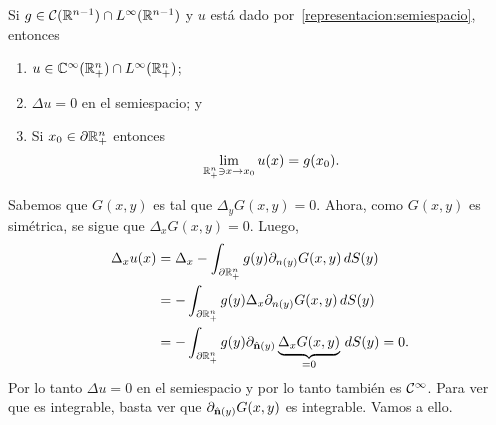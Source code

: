 \documentclass[../edp.tex]{subfiles}
\begin{document}
\begin{Teorema}
	Si \(g\in \mathcal{C}(\mathbb{R}^{n-1}) \cap L^{\infty}(\mathbb{R}^{n-1})\) y \(u\) está dado
	por~\eqref{representacion:semiespacio}, entonces
	\begin{enumerate}
		\item \(u\in \mathbb{C}^{\infty}(\mathbb{R}^n_{+}) \cap L^{\infty}(\mathbb{R}^n_{+})\);
		\item \(\Delta u = 0\) en el semiespacio; y
		\item Si \(x_0 \in \partial\mathbb{R}^{n}_{+}\) entonces 
		\begin{displaymath}
			\lim_{\mathbb{R}^{n}_{+} \ni x\to x_0} u(x) = g(x_0).
		\end{displaymath}
	\end{enumerate}
\end{Teorema}
\begin{Demostracion}
	Sabemos que \(G(x,y)\) es tal que \(\Delta_{y} G(x,y) = 0\). Ahora, como
	\(G(x,y)\) es simétrica, se sigue que \(\Delta_{x} G(x,y) = 0\). Luego,
	\begin{align*}
		\Delta_{x} u(x)
		&=
		\Delta_{x}
		- \int_{\partial\mathbb{R}^{n}_{+}}
			g(y) \partial_{n(y)} G(x,y) \, dS(y)
		\\&=
		- \int_{\partial\mathbb{R}^{n}_{+}}
			g(y) 
			\Delta_{x} \partial_{n(y)} G(x,y) \, dS(y)
		\\&=
		- \int_{\partial\mathbb{R}^{n}_{+}}
			g(y) 
			\partial_{\hat{\textbf{n}}(y)} 
			\underbrace{\Delta_{x} G(x,y)}_{=0} 
			\, dS(y)
		= 0.
	\end{align*}
	Por lo tanto \(\Delta u = 0\) en el semiespacio y por lo tanto también es
	\(\mathcal{C}^{\infty}\). Para ver que es integrable, basta ver que
	\(\partial_{\hat{\textbf{n}}(y)} G(x,y)\) es integrable. Vamos a ello.


\end{Demostracion}
\end{document}
